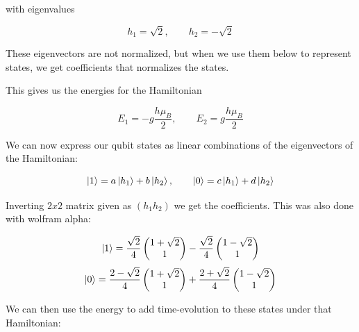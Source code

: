 \documentclass[a4paper,norsk, 10pt]{article}
\begin{document}
with eigenvalues

\begin{equation}
h_1 = \sqrt{2},\qquad h_2  = -\sqrt{2}
\end{equation}

These eigenvectors are not normalized, but when we use them below to represent states, we get coefficients that normalizes the states. 

This gives us the energies for the Hamiltonian

\begin{equation}
E_1 = -g\frac{h\mu_B}{2}, \qquad E_2 = g\frac{h\mu_B}{2}
\end{equation}

We can now express our qubit states as linear combinations of the eigenvectors of the Hamiltonian:

\begin{equation}
\ket{1} = a\ket{h_1} + b\ket{h_2}, \qquad \ket{0} = c\ket{h_1} + d\ket{h_2}
\end{equation}

Inverting $2x2$ matrix given as $(h_1 h_2)$ we get the coefficients. This was also done with wolfram alpha:

\begin{equation}
\ket{1} = \frac{\sqrt{2}}{4}
\begin{pmatrix}
1 + \sqrt{2} \\ 1
\end{pmatrix}
-\frac{\sqrt{2}}{4}
\begin{pmatrix}
1 - \sqrt{2} \\ 1
\end{pmatrix}
\end{equation}
\begin{equation}
\ket{0} = \frac{2-\sqrt{2}}{4}
\begin{pmatrix}
1 + \sqrt{2} \\ 1
\end{pmatrix}
+\frac{2+\sqrt{2}}{4}
\begin{pmatrix}
1 - \sqrt{2} \\ 1
\end{pmatrix}
\end{equation}

We can then use the energy to add time-evolution to these states under that Hamiltonian:
\end{document}
